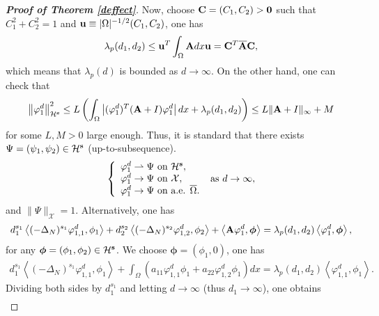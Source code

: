 \documentclass[a4paper,11pt]{amsart}
\theoremstyle{definition}
\def\O{\Omega}
\numberwithin{equation}{section}
\theoremstyle{definition}
\def\O{\Omega}
\begin{document}
\begin{proof} [\bf Proof of Theorem \ref{deffect}]
Now, choose ${\bf C}=(C_1,C_2)>{\bf 0}$ such that $C^2_1+C_2^2=1$ and ${\bf u}\equiv |\O|^{-1/2}(C_1,C_2)$, one has
\begin{align*}
\lambda_p(d_1,d_2)\leq {\bf u}^T\int_{\O}\textbf{A}dx{\bf u}={\bf C}^T\overline{\bf A}{\bf C},
\end{align*}
which means that $\lambda_p(d)$ is bounded as $d\rightarrow \infty$.
On the other hand, one can check that
\begin{align*}
\left\|\varphi^d_1\right\|_{\mathcal{H}^{\bf s}}^2\leq L\left(\int_{\O}\left|(\varphi_{1}^d)^T(\textbf{A}+I)\varphi_{1}^d \right|dx+\lambda_p(d_1,d_2)\right)\leq L\|{\bf A}+I\|_{\infty} + M
\end{align*}
for some $L,M>0 $ large enough. Thus, it is standard that there exists $\Psi=(\psi_1,\psi_2)\in \mathcal{H}^{\bf s}$ (up-to-subsequence). 
\begin{align*}
\left\{\begin{array}{llll}
\varphi^{d}_1	\rightharpoonup \Psi \text{ on }\mathcal{H}^{\bf s},\\
\varphi^{d}_1	\rightarrow \Psi \text{ on }\mathcal{X},\\
\varphi^{d}_1	\rightarrow \Psi\text{ on a.e. }\overline{\O}.
\end{array}
\right. \text{ as }d\rightarrow \infty,
\end{align*} 
and $\|\Psi\|_{\mathcal{X}}=1$. Alternatively, one has
\begin{align}\label{eq:eigenpro1}
d^{s_1}_1\left<(-\Delta_N)^{s_1}\varphi_{1,1}^d,\phi_1\right>+d^{s_2}_2\left<(-\Delta_N)^{s_2}\varphi_{1,2}^d,\phi_2\right>+\left<{\bf A}\varphi_{1}^d,\boldsymbol{\phi}\right>=\lambda_p(d_1,d_2)\left<\varphi_{1}^d,\boldsymbol{\phi}\right>,
\end{align}
for any $\boldsymbol{\phi}=(\phi_1,\phi_2)\in \mathcal{H}^{\bf s}$. We choose $\boldsymbol{\phi}=(\phi_1,0)$, one has
\begin{align*}
d^{s_1}_1\left<(-\Delta_N)^{s_1}\varphi_{1,1}^d,\phi_1\right>+\int_{\O}\left(a_{11} \varphi_{1,1}^d\phi_1+ a_{22} \varphi_{1,2}^d\phi_1\right) dx =\lambda_p(d_1,d_2)\left<\varphi_{1,1}^d,\phi_1\right>.
\end{align*}
Dividing both sides by $d_1^{s_1}$ and letting $d \to \infty$ (thus $d_1 \to \infty$), one obtains
\begin{align*}

\end{align*}
\end{proof}
\end{document}
